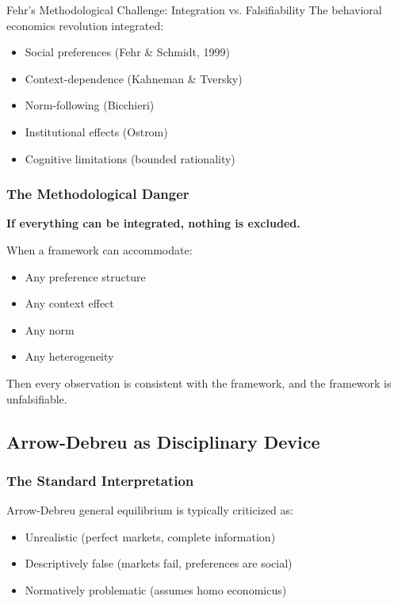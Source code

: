 \begin{chapter}{Fehr's Methodological Challenge: Integration vs. Falsifiability}
The behavioral economics revolution integrated:
\begin{itemize}[noitemsep]
    \item Social preferences (Fehr \& Schmidt, 1999)
    \item Context-dependence (Kahneman \& Tversky)
    \item Norm-following (Bicchieri)
    \item Institutional effects (Ostrom)
    \item Cognitive limitations (bounded rationality)
\end{itemize}

\subsubsection{The Methodological Danger}

\begin{tcolorbox}[colback=red!5!white,colframe=red!75!black,title=\textbf{Fehr's Alarm}]
\begin{center}
\textbf{If everything can be integrated, nothing is excluded.}
\end{center}

When a framework can accommodate:
\begin{itemize}[noitemsep]
    \item Any preference structure
    \item Any context effect
    \item Any norm
    \item Any heterogeneity
\end{itemize}

Then every observation is consistent with the framework, and the framework is unfalsifiable.
\end{tcolorbox}

\subsection{Arrow-Debreu as Disciplinary Device}

\subsubsection{The Standard Interpretation}

Arrow-Debreu general equilibrium is typically criticized as:
\begin{itemize}[noitemsep]
    \item Unrealistic (perfect markets, complete information)
    \item Descriptively false (markets fail, preferences are social)
    \item Normatively problematic (assumes homo economicus)
\end{itemize}


\end{chapter}
